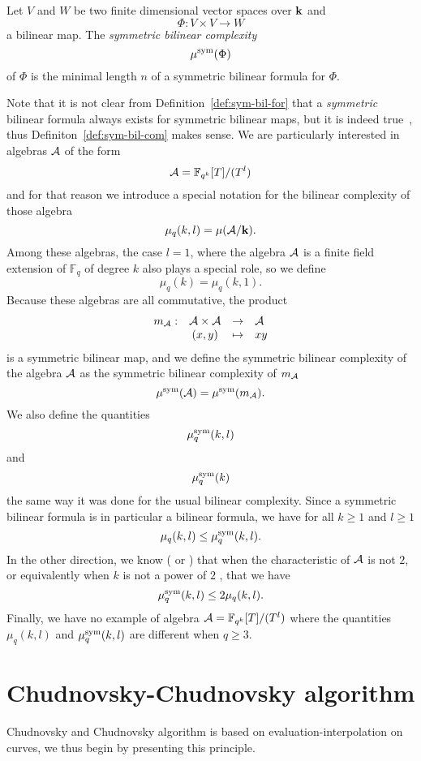 \begin{defi}
  \label{def:sym-bil-com}
  Let $V$ and $W$ be two finite dimensional vector spaces over $\mathbf{k}$ and 
  \[
    \Phi:V\times V\to W
  \]
  a bilinear map. The \emph{symmetric bilinear complexity} 
  \[
    \mu^{\textrm{sym}}(\Phi)
  \]
  of $\Phi$ is the minimal length $n$ of a symmetric bilinear formula for
  $\Phi$.
\end{defi}
Note that it is not clear from Definition~\ref{def:sym-bil-for} that a
\emph{symmetric} bilinear formula always
exists for symmetric bilinear maps, but it is indeed
true~\cite[Lemma $1.6$]{Randriam12}, thus
Definiton~\ref{def:sym-bil-com} makes sense. We are particularly
interested in algebras $\mathcal{A}$ of the form
\[
  \mathcal{A} = \mathbb{F}_{q^k}[T]/(T^l)
\]
and for that reason we introduce a special notation for the bilinear complexity
of those algebra
\[
  \mu_q(k, l) = \mu(\mathcal{A}/\mathbf{k}).
\]
Among these algebras, the case $l=1$, where the algebra $\mathcal{A}$ is a finite field
extension of $\mathbb{F}_q$ of degree $k$ also plays a special role, so we
define 
\[
  \mu_q(k) = \mu_q(k, 1).
\]
Because these algebras are all commutative, the product 
\[
\begin{array}{lccl}
  m_{\mathcal{A}}:&\mathcal{A}\times \mathcal{A}&\to&\mathcal{A}\\
  &(x, y)&\mapsto&xy
\end{array}
\]
is a symmetric bilinear map, and we define the symmetric bilinear complexity of
the algebra $\mathcal{A}$ as the symmetric bilinear complexity of $m_{\mathcal{A}}$
\[
  \mu^{\textrm{sym}}(\mathcal{A}) = \mu^{\textrm{sym}}(m_{\mathcal{A}}).
\]
We also define the quantities
\[
  \mu^{\textrm{sym}}_q(k, l)
\]
and 
\[
  \mu^{\textrm{sym}}_q(k)
\]
the same way it was done for the usual bilinear complexity. Since a symmetric
bilinear formula is in particular a bilinear formula, we have for all $k\geq1$
and $l\geq1$
\[
  \mu_q(k, l)\leq\mu^{\textrm{sym}}_q(k, l).
\]
In the other direction, we know (\cite[Theorem $1$]{SL84} or \cite[Lemma
$1.6$]{Randriam12}) that when the characteristic of $\mathcal{A}$ is not $2$,
or equivalently when $k$ is not a power of $2$ , that we have
\[
  \mu^{\textrm{sym}}_q(k, l)\leq2\mu_q(k, l).
\]
Finally, we have no example of algebra $\mathcal{A} = \mathbb{F}_{q^k}[T]/(T^l)$ where the
quantities $\mu_q(k, l)$ and $\mu^{\textrm{sym}}_q(k, l)$ are different when $q\geq3$.

\section{Chudnovsky-Chudnovsky algorithm}
Chudnovsky and Chudnovsky algorithm is based on evaluation-interpolation on
curves, we thus begin by presenting this principle.

